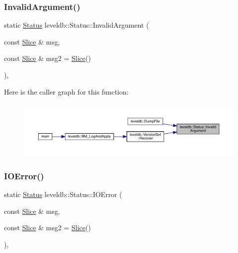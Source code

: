 \subsubsection{\texorpdfstring{InvalidArgument()}{InvalidArgument()}}
{\footnotesize\ttfamily static \mbox{\hyperlink{classleveldb_1_1_status}{Status}} leveldb\+::\+Status\+::\+Invalid\+Argument (\begin{DoxyParamCaption}\item[{const \mbox{\hyperlink{classleveldb_1_1_slice}{Slice}} \&}]{msg,  }\item[{const \mbox{\hyperlink{classleveldb_1_1_slice}{Slice}} \&}]{msg2 = {\ttfamily \mbox{\hyperlink{classleveldb_1_1_slice}{Slice}}()} }\end{DoxyParamCaption})\hspace{0.3cm}{\ttfamily [inline]}, {\ttfamily [static]}}

Here is the caller graph for this function\+:
\nopagebreak
\begin{figure}[H]
\begin{center}
\leavevmode
\includegraphics[width=350pt]{classleveldb_1_1_status_aefef9f88d0a6ca6d34bd9dec1670309e_icgraph}
\end{center}
\end{figure}
\mbox{\label{classleveldb_1_1_status_ada6143081d41803808f77287153f96b7}} 
\subsubsection{\texorpdfstring{IOError()}{IOError()}}
{\footnotesize\ttfamily static \mbox{\hyperlink{classleveldb_1_1_status}{Status}} leveldb\+::\+Status\+::\+I\+O\+Error (\begin{DoxyParamCaption}\item[{const \mbox{\hyperlink{classleveldb_1_1_slice}{Slice}} \&}]{msg,  }\item[{const \mbox{\hyperlink{classleveldb_1_1_slice}{Slice}} \&}]{msg2 = {\ttfamily \mbox{\hyperlink{classleveldb_1_1_slice}{Slice}}()} }\end{DoxyParamCaption})\hspace{0.3cm}{\ttfamily [inline]}, {\ttfamily [static]}}

